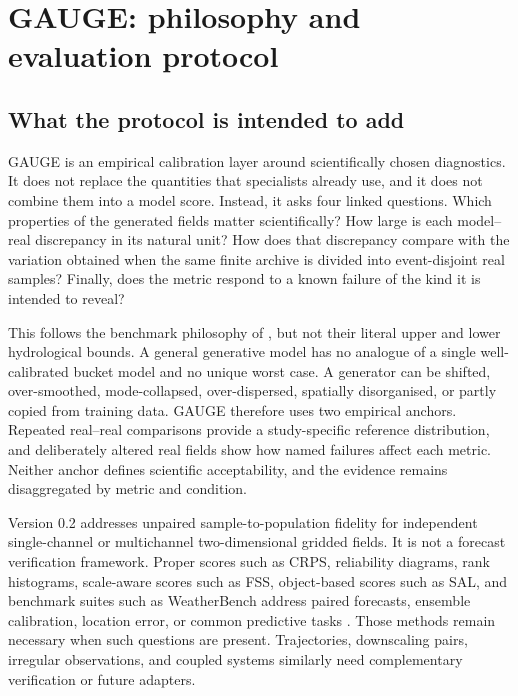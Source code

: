 \documentclass[gmd, manuscript]{copernicus}
\begin{document}
\section{GAUGE: philosophy and evaluation protocol}
\label{sec:protocol}

\subsection{What the protocol is intended to add}

GAUGE is an empirical calibration layer around scientifically chosen diagnostics. It
does not replace the quantities that specialists already use, and it does not combine
them into a model score. Instead, it asks four linked questions. Which properties of
the generated fields matter scientifically? How large is each model--real discrepancy
in its natural unit? How does that discrepancy compare with the variation obtained
when the same finite archive is divided into event-disjoint real samples? Finally, does
the metric respond to a known failure of the kind it is intended to reveal?

This follows the benchmark philosophy of \citet{Seibert2018}, but not their literal
upper and lower hydrological bounds. A general generative model has no analogue of a
single well-calibrated bucket model and no unique worst case. A generator can be
shifted, over-smoothed, mode-collapsed, over-dispersed, spatially disorganised, or
partly copied from training data. GAUGE therefore uses two empirical anchors. Repeated
real--real comparisons provide a study-specific reference distribution, and
deliberately altered real fields show how named failures affect each metric. Neither
anchor defines scientific acceptability, and the evidence remains disaggregated by
metric and condition.

Version 0.2 addresses unpaired sample-to-population fidelity for independent
single-channel or multichannel two-dimensional gridded fields. It is not a forecast
verification framework. Proper scores such as CRPS, reliability diagrams, rank
histograms, scale-aware scores such as FSS, object-based scores such as SAL, and
benchmark suites such as WeatherBench address paired forecasts, ensemble calibration,
location error, or common predictive tasks \citep{GneitingRaftery2007,Hamill2001,
RobertsLean2008,Wernli2008,Rasp2020}. Those methods remain necessary when such
questions are present. Trajectories, downscaling pairs, irregular observations, and
coupled systems similarly need complementary verification or future adapters.
\end{document}
